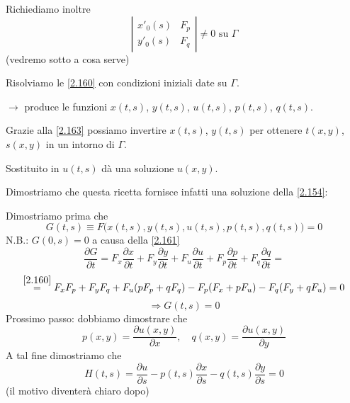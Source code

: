 \documentclass[a4paper,11pt]{report}
\begin{document}
Richiediamo inoltre
\begin{equation}
\left| \begin{matrix}
x'_0(s) & F_p\\
y'_0(s) & F_q
\end{matrix}\right| \neq 0 \text{ su } \Gamma
\label{2.163}
\end{equation}
(vedremo sotto a cosa serve)

Risolviamo le \eqref{2.160} con condizioni iniziali date su $\Gamma$.

$\rightarrow$ produce le funzioni $x(t,s)$, $y(t,s)$, $u(t,s)$, $p(t,s)$, $q(t,s)$.

Grazie alla \eqref{2.163} possiamo invertire $x(t,s)$, $y(t,s)$ per ottenere $t(x,y)$, $s(x,y)$ in un intorno di $\Gamma$. 

Sostituito in $u(t,s)$ d\`a una soluzione $u(x,y)$.

Dimostriamo che questa ricetta fornisce infatti una soluzione della \eqref{2.154}:

Dimostriamo prima che 
\[
G(t,s) \equiv F\big(x(t,s),y(t,s),u(t,s),p(t,s),q(t,s)\big)=0
\]
N.B.: $G(0,s)=0$ a causa della \eqref{2.161}
\[
\frac{\partial G}{\partial t} = F_x \frac{\partial x}{\partial t} + F_y \frac{\partial y}{\partial t} + F_u \frac{\partial u}{\partial t} + F_p \frac{\partial p}{\partial t} + F_q \frac{\partial q}{\partial t}=
\]
\[
\overset{\eqref{2.160}}{=}F_xF_p + F_y F_q + F_u(pF_p + qF_q) - F_p(F_x + pF_u) - F_q(F_y + qF_u)=0
\]
\[
\Rightarrow G(t,s)=0
\]
Prossimo passo: dobbiamo dimostrare che 
\[
p(x,y)=\frac{\partial u(x,y)}{\partial x}, \quad q(x,y)=\frac{\partial u(x,y)}{\partial y}
\]
A tal fine dimostriamo che 
\begin{equation}
H(t,s)=\frac{\partial u}{\partial s} - p(t,s)\frac{\partial x}{\partial s} - q(t,s) \frac{\partial y}{\partial s} =0 
\label{2.164}
\end{equation}
(il motivo diventer\`a chiaro dopo)
\end{document}
